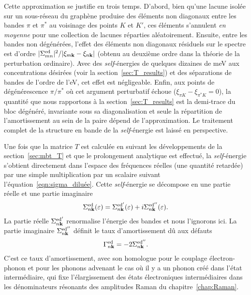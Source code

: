 Cette approximation se justifie en trois temps. D'abord, bien qu'une lacune isolée sur un sous-réseau du graphène produise des éléments non diagonaux entre les bandes $\pi$ et $\pi^*$ au voisinage des points $K$ et $K'$, ces éléments s'annulent \textit{en moyenne} pour une collection de lacunes réparties aléatoirement. Ensuite, entre les bandes non dégénérées, l'effet des éléments non diagonaux résiduels sur le spectre est d'ordre $|\Sigma^\text{ed}_{mn}|^2/|\xi_{m\mathbf{k}}-\xi_{n\mathbf{k}}|$ (obtenu au deuxième ordre dans la théorie de la perturbation ordinaire). Avec des \textit{self}-énergies de quelques dizaines de meV aux concentrations désirées (voir la section~\ref{sec:T_results}) et des séparations de bandes de l'ordre de l'eV, cet effet est négligeable. Enfin, aux points de dégénérescence $\pi/\pi^*$ où cet argument perturbatif échoue ($\xi_{\pi K}-\xi_{\pi^*K}=0$), la quantité que nous rapportons à la section~\ref{sec:T_results} est la demi-trace du bloc dégénéré, invariante sous sa diagonalisation et seule la répartition de l'amortissement au sein de la paire dépend de l'approximation. Le traitement complet de la structure en bande de la \textit{self}-énergie est laissé en perspective.

Une fois que la matrice $T$ est calculée en suivant les développements de la section~\ref{sec:mbt_T} et que le prolongement analytique est effectué, la \textit{self}-énergie s'obtient directement dans l'espace des fréquences réelles (une quantité retardée) par une simple multiplication par un scalaire suivant l'équation~\eqref{eqn:sigma_diluée}. Cette \textit{self}-énergie se décompose en une partie réelle et une partie imaginaire
\begin{equation}
    \Sigma_{n\mathbf{k}}^\text{ed}(\varepsilon) = \Sigma_{n\mathbf{k}}^{\text{ed}'}(\varepsilon) + i\Sigma_{n\mathbf{k}}^{\text{ed}''}(\varepsilon).
\end{equation}
La partie réelle $\Sigma_{n\mathbf{k}}^{\text{ed}'}$ renormalise l'énergie des bandes et nous l'ignorons ici. La partie imaginaire $\Sigma_{n\mathbf{k}}^{\text{ed}''}$ définit le taux d'amortissement dû aux défauts
\begin{equation}
\Gamma_{n\mathbf{k}}^{\text{ed}} = -2\Sigma_{n\mathbf{k}}^{\text{ed}''}.
\end{equation}
C'est ce taux d'amortissement, avec son homologue pour le couplage électron-phonon et pour les phonons advenant le cas où il y a un phonon créé dans l'état intermédiaire, qui fixe l'élargissement des états électroniques intermédiaires dans les dénominateurs résonants des amplitudes Raman du chapitre~\ref{chap:Raman}.


